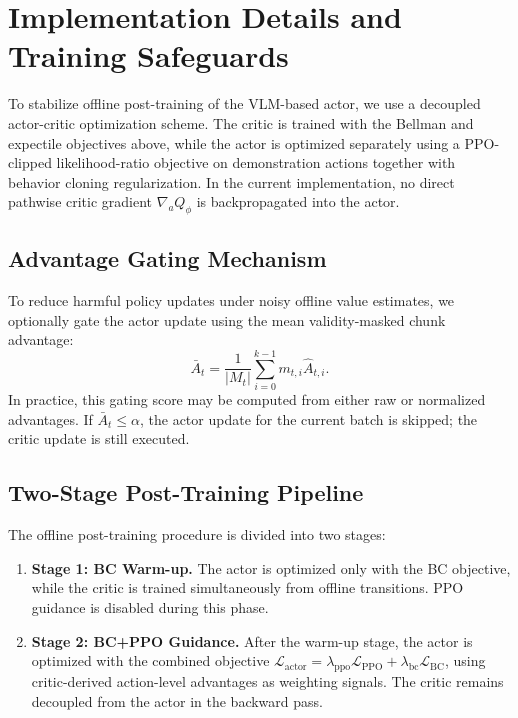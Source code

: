 \documentclass{article}
\begin{document}
\section{Implementation Details and Training Safeguards}
\label{sec:implementation_and_safeguards}

To stabilize offline post-training of the VLM-based actor, we use a decoupled actor-critic optimization scheme. The critic is trained with the Bellman and expectile objectives above, while the actor is optimized separately using a PPO-clipped likelihood-ratio objective on demonstration actions together with behavior cloning regularization. In the current implementation, no direct pathwise critic gradient $\nabla_a Q_\phi$ is backpropagated into the actor.

\subsection{Advantage Gating Mechanism}
\label{sec:gating_mechanism}
To reduce harmful policy updates under noisy offline value estimates, we optionally gate the actor update using the mean validity-masked chunk advantage:
\begin{equation}
\bar{A}_t = \frac{1}{|M_t|} \sum_{i=0}^{k-1} m_{t,i} \hat A_{t,i}.
\end{equation}
In practice, this gating score may be computed from either raw or normalized advantages. If $\bar{A}_t \le \alpha$, the actor update for the current batch is skipped; the critic update is still executed.

\subsection{Two-Stage Post-Training Pipeline}
\label{sec:staged_pipeline}
The offline post-training procedure is divided into two stages:
\begin{enumerate}
    \item \textbf{Stage 1: BC Warm-up.} The actor is optimized only with the BC objective, while the critic is trained simultaneously from offline transitions. PPO guidance is disabled during this phase.
    \item \textbf{Stage 2: BC+PPO Guidance.} After the warm-up stage, the actor is optimized with the combined objective $\mathcal{L}_{\mathrm{actor}} = \lambda_{\mathrm{ppo}}\mathcal{L}_{\mathrm{PPO}} + \lambda_{\mathrm{bc}}\mathcal{L}_{\mathrm{BC}}$, using critic-derived action-level advantages as weighting signals. The critic remains decoupled from the actor in the backward pass.
\end{enumerate}
\end{document}
